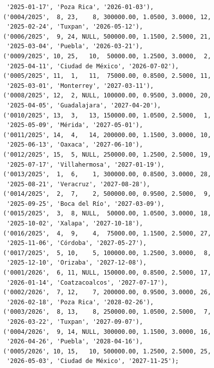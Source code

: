 \begin{verbatim}
	   '2025-01-17', 'Poza Rica', '2026-01-03'),
	  ('0004/2025',  8, 23,    8, 300000.00, 1.0500, 3.0000, 12,
	   '2025-02-24', 'Tuxpan', '2026-05-12'),
	  ('0006/2025',  9, 24, NULL, 500000.00, 1.1500, 2.5000, 21,
	   '2025-03-04', 'Puebla', '2026-03-21'),
	  ('0009/2025', 10, 25,   10,  50000.00, 1.2500, 3.0000,  2,
	   '2025-04-11', 'Ciudad de México', '2026-07-02'),
	  ('0005/2025', 11,  1,   11,  75000.00, 0.8500, 2.5000, 11,
	   '2025-03-01', 'Monterrey', '2027-03-11'),
	  ('0008/2025', 12,  2, NULL, 100000.00, 0.9500, 3.0000, 20,
	   '2025-04-05', 'Guadalajara', '2027-04-20'),
	  ('0010/2025', 13,  3,   13, 150000.00, 1.0500, 2.5000,  1,
	   '2025-05-09', 'Mérida', '2027-05-01'),
	  ('0011/2025', 14,  4,   14, 200000.00, 1.1500, 3.0000, 10,
	   '2025-06-13', 'Oaxaca', '2027-06-10'),
	  ('0012/2025', 15,  5, NULL, 250000.00, 1.2500, 2.5000, 19,
	   '2025-07-17', 'Villahermosa', '2027-01-19'),
	  ('0013/2025',  1,  6,    1, 300000.00, 0.8500, 3.0000, 28,
	   '2025-08-21', 'Veracruz', '2027-08-28'),
	  ('0014/2025',  2,  7,    2, 500000.00, 0.9500, 2.5000,  9,
	   '2025-09-25', 'Boca del Río', '2027-03-09'),
	  ('0015/2025',  3,  8, NULL,  50000.00, 1.0500, 3.0000, 18,
	   '2025-10-02', 'Xalapa', '2027-10-18'),
	  ('0016/2025',  4,  9,    4,  75000.00, 1.1500, 2.5000, 27,
	   '2025-11-06', 'Córdoba', '2027-05-27'),
	  ('0017/2025',  5, 10,    5, 100000.00, 1.2500, 3.0000,  8,
	   '2025-12-10', 'Orizaba', '2027-12-08'),
	  ('0001/2026',  6, 11, NULL, 150000.00, 0.8500, 2.5000, 17,
	   '2026-01-14', 'Coatzacoalcos', '2027-07-17'),
	  ('0002/2026',  7, 12,    7, 200000.00, 0.9500, 3.0000, 26,
	   '2026-02-18', 'Poza Rica', '2028-02-26'),
	  ('0003/2026',  8, 13,    8, 250000.00, 1.0500, 2.5000,  7,
	   '2026-03-22', 'Tuxpan', '2027-09-07'),
	  ('0004/2026',  9, 14, NULL, 300000.00, 1.1500, 3.0000, 16,
	   '2026-04-26', 'Puebla', '2028-04-16'),
	  ('0005/2026', 10, 15,   10, 500000.00, 1.2500, 2.5000, 25,
	   '2026-05-03', 'Ciudad de México', '2027-11-25');


\end{verbatim}
